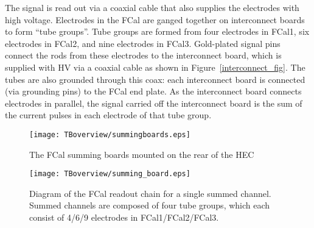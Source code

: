 The signal is read out via a coaxial cable that also supplies the electrodes with high voltage. Electrodes in the FCal are ganged together on interconnect boards to form ``tube groups''. Tube groups are formed from four electrodes in FCal1, six electrodes in FCal2, and nine electrodes in FCal3. Gold-plated signal pins connect the rods from these electrodes to the interconnect board, which is supplied with HV via a coaxial cable as shown in Figure~\ref{interconnect_fig}. The tubes are also grounded through this coax: each interconnect board is connected (via grounding pins) to the FCal end plate. As the interconnect board connects electrodes in parallel, the signal carried off the interconnect board is the sum of the current pulses in each electrode of that tube group.


%
%
%
%
%
%
%
%

 \begin{figure}[tb]
\begin{center}
\texttt{[image: TBoverview/summingboards.eps]}
\end{center}
\caption[Summing boards for the FCal.]{The FCal summing boards mounted on the rear of the HEC\cite{FCal_jinst_2010}}
\label{fig_summing_board_hec}
\end{figure}
\begin{figure}[tb]
\begin{center}
\texttt{[image: TBoverview/summing\_board.eps]}
\end{center}
\caption[Readout chain for a single summed FCal channel.]{Diagram of the FCal readout chain for a single summed channel. Summed channels are composed of four tube groups, which each consist of 4/6/9 electrodes in FCal1/FCal2/FCal3.}
\label{fig_sum_board}
\end{figure}

